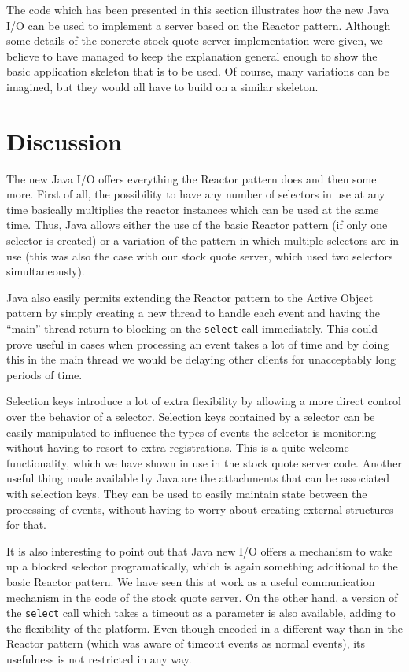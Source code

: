 \documentclass[a4paper,10pt]{article}
\begin{document}
The code which has been presented in this section illustrates how the new Java I/O can be used to implement
a server based on the Reactor pattern. Although some details of the concrete stock quote server implementation
were given, we believe to have managed to keep the explanation general enough to show the basic application
skeleton that is to be used. Of course, many variations can be imagined, but they would all have to build on
a similar skeleton.

\section{Discussion}
\label{discussion}

The new Java I/O offers everything the Reactor pattern does and then some more. First of all, the possibility to
have any number of selectors in use at any time basically multiplies the reactor instances which can be used at
the same time. Thus, Java allows either the use of the basic Reactor pattern (if only one selector is created) or
a variation of the pattern in which multiple selectors are in use (this was also the case with our stock quote
server, which used two selectors simultaneously).

Java also easily permits extending the Reactor pattern to the Active Object pattern by simply creating a new
thread to handle each event and having the ``main'' thread return to blocking on the \texttt{select} call immediately.
This could prove useful in cases when processing an event takes a lot of time and by doing this in the main
thread we would be delaying other clients for unacceptably long periods of time.

Selection keys introduce a lot of extra flexibility by allowing a more direct control over the behavior of a
selector. Selection keys contained by a selector can be easily manipulated to influence the types of events
the selector is monitoring without having to resort to extra registrations. This is a quite welcome functionality,
which we have shown in use in the stock quote server code. Another useful thing made available by Java are
the attachments that can be associated with selection keys. They can be used to easily maintain state between
the processing of events, without having to worry about creating external structures for that.

It is also interesting to point out that Java new I/O offers a mechanism to wake up a blocked selector programatically,
which is again something additional to the basic Reactor pattern. We have seen this at work as a useful communication
mechanism in the code of the stock quote server. On the other hand, a version of the \texttt{select} call which takes
a timeout as a parameter is also available, adding to the flexibility of the platform. Even though encoded in a
different way than in the Reactor pattern (which was aware of timeout events as normal events), its usefulness
is not restricted in any way.
\end{document}
